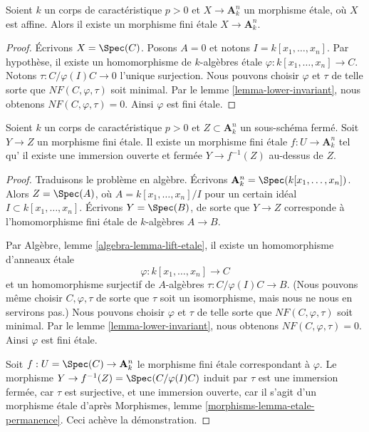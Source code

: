 \begin{lemma}
\label{lemma-affine-etale-over-affine-space}
Soient $k$ un corps de caractéristique $p > 0$ et $X \to \mathbf{A}^n_k$ un
morphisme \'etale, où $X$ est affine. Alors il existe un morphisme fini \'etale
$X \to \mathbf{A}^n_k$.
\end{lemma}

\begin{proof}
Écrivons $X = \Spec(C)$. Posons $A = 0$ et notons $I = k[x_1, \ldots, x_n]$.
Par hypothèse, il existe un homomorphisme de $k$-algèbres \'etale
$\varphi : k[x_1, \ldots, x_n] \to C$. Notons $\tau : C/\varphi(I)C \to 0$
l'unique surjection. Nous pouvons choisir $\varphi$ et $\tau$ de telle sorte
que $NF(C, \varphi, \tau)$ soit minimal. Par le lemme \ref{lemma-lower-invariant},
nous obtenons $NF(C, \varphi, \tau) = 0$. Ainsi $\varphi$ est fini \'etale.
\end{proof}

\begin{lemma}
\label{lemma-dominate-affine-space}
Soient $k$ un corps de caractéristique $p > 0$ et $Z \subset \mathbf{A}^n_k$
un sous-schéma fermé. Soit $Y \to Z$ un morphisme fini \'etale. Il existe un
morphisme fini \'etale $f : U \to \mathbf{A}^n_k$ tel qu'
il existe une immersion ouverte et fermée $Y \to f^{-1}(Z)$ au-dessus de $Z$.
\end{lemma}

\begin{proof}
Traduisons le problème en algèbre. Écrivons
$\mathbf{A}^n_k = \Spec(k[x_1, \ldots, x_n])$.
Alors $Z = \Spec(A)$, où $A = k[x_1, \ldots, x_n]/I$
pour un certain idéal $I \subset k[x_1, \ldots, x_n]$.
Écrivons $Y = \Spec(B)$, de sorte que $Y \to Z$ corresponde à
l'homomorphisme fini \'etale de $k$-algèbres $A \to B$.

\medskip\noindent
Par Algèbre, lemme \ref{algebra-lemma-lift-etale},
il existe un homomorphisme d'anneaux \'etale
$$
\varphi : k[x_1, \ldots, x_n] \to C
$$
et un homomorphisme surjectif de $A$-algèbres $\tau : C/\varphi(I)C \to B$.
(Nous pouvons même choisir $C, \varphi, \tau$ de sorte que $\tau$ soit un isomorphisme,
mais nous ne nous en servirons pas.) Nous pouvons choisir $\varphi$ et $\tau$ de telle sorte
que $NF(C, \varphi, \tau)$ soit minimal. Par le lemme \ref{lemma-lower-invariant},
nous obtenons $NF(C, \varphi, \tau) = 0$. Ainsi $\varphi$ est fini \'etale.

\medskip\noindent
Soit $f : U = \Spec(C) \to \mathbf{A}^n_k$ le morphisme fini \'etale
correspondant à $\varphi$. Le morphisme
$Y \to f^{-1}(Z) = \Spec(C/\varphi(I)C)$ induit par $\tau$
est une immersion fermée, car $\tau$ est surjective, et une immersion ouverte, car
il s'agit d'un morphisme \'etale d'après Morphismes, lemme
\ref{morphisms-lemma-etale-permanence}. Ceci achève la démonstration.
\end{proof}

